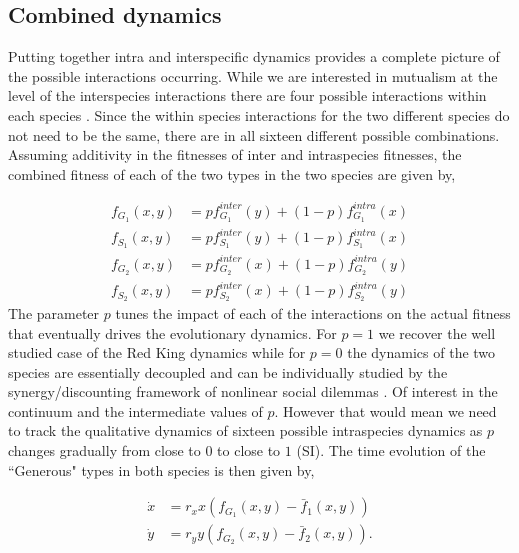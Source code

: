 \documentclass[12pt]{article}
\begin{document}
\subsection{Combined dynamics}

Putting together intra and interspecific dynamics provides a complete picture of the possible interactions occurring. While we are interested in mutualism at the level of the interspecies interactions there are four possible interactions within each species \citep{nowak:Science:2004,hauert:JTB:2006a}. Since the within species interactions for the two different species do not need to be the same, there are in all sixteen different possible combinations.
Assuming additivity in the fitnesses of inter and intraspecies fitnesses, the combined fitness of each of the two types in the two species are given by,

%
\begin{align}
	f_{G_1} (x,y) &= p f^{inter}_{G_1} (y) + (1-p) f^{intra}_{G_1} (x) \nonumber \\
	f_{S_1} (x,y) &= p f^{inter}_{S_1} (y) + (1-p) f^{intra}_{S_1} (x) \nonumber \\
	f_{G_2} (x,y) &= p f^{inter}_{G_2} (x) + (1-p) f^{intra}_{G_2} (y) \\
	f_{S_2} (x,y) &= p f^{inter}_{S_2} (x) + (1-p) f^{intra}_{S_2} (y) \nonumber
\end{align}
%
The parameter $p$ tunes the impact of each of the interactions on the actual fitness that eventually drives the evolutionary dynamics.
For $p=1$ we recover the well studied case of the Red King dynamics \citep{gokhale:PRSB:2012} while for $p=0$ the dynamics of the two species are essentially decoupled and can be individually studied by the synergy/discounting framework of nonlinear social dilemmas \citep{hauert:JTB:2006a}.
Of interest in the continuum and the intermediate values of $p$.
However that would mean we need to track the qualitative dynamics of sixteen possible intraspecies dynamics as $p$ changes gradually from close to $0$ to close to $1$ (SI). 
The time evolution of the ``Generous" types in both species is then given by,

\begin{align}
\dot{x} &= r_x x \left(f_{G_1}(x,y) -  \bar{f}_1(x,y) \right) \nonumber \\
\dot{y} &= r_y y \left(f_{G_2}(x,y) -  \bar{f}_2(x,y) \right).
\label{eq:repeqs}
\end{align}
\end{document}
